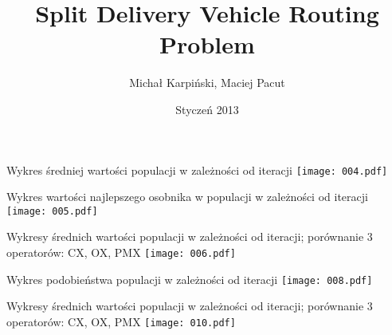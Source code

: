 \documentclass{beamer}
\title{Split Delivery Vehicle Routing Problem}
\author{Michał Karpiński, Maciej Pacut}
\date{Styczeń 2013}
\begin{document}
\maketitle

\begin{frame}{Wykres średniej wartości populacji w zależności od iteracji}
  \texttt{[image: 004.pdf]}
\end{frame}

\begin{frame}{Wykres wartości najlepszego osobnika w populacji w
    zależności od iteracji}
  \texttt{[image: 005.pdf]}
\end{frame}

\begin{frame}{Wykresy średnich wartości populacji w zależności od
    iteracji; porównanie 3 operatorów: CX, OX, PMX}
  \texttt{[image: 006.pdf]}
\end{frame}

\begin{frame}{Wykres podobieństwa populacji w zależności od iteracji}
  \texttt{[image: 008.pdf]}
\end{frame}


\begin{frame}{Wykresy średnich wartości populacji w zależności od
    iteracji; porównanie 3 operatorów: CX, OX, PMX}
  \texttt{[image: 010.pdf]}
\end{frame}
\end{document}
